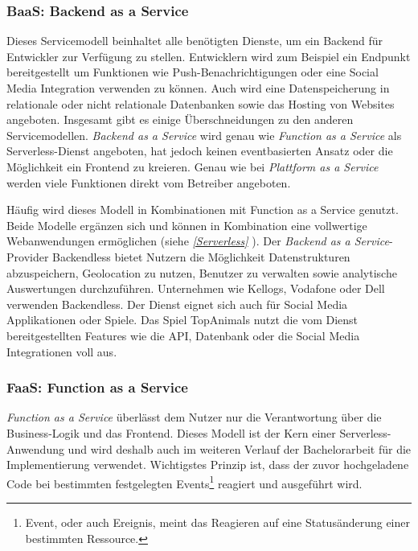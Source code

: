    \subsubsection{BaaS: Backend as a Service}
   Dieses Servicemodell beinhaltet alle benötigten Dienste, um ein Backend für Entwickler zur Verfügung zu stellen.
   Entwicklern wird zum Beispiel ein Endpunkt bereitgestellt um Funktionen wie Push-Benachrichtigungen oder eine Social Media Integration verwenden zu können.
   Auch wird eine Datenspeicherung in relationale oder nicht relationale Datenbanken sowie das Hosting von Websites angeboten. Insgesamt gibt es einige Überschneidungen zu den anderen Servicemodellen.
   \textsl{Backend as a Service} wird genau wie \textsl{Function as a Service} als Serverless-Dienst angeboten, hat jedoch keinen eventbasierten Ansatz oder die Möglichkeit ein Frontend zu kreieren.
   Genau wie bei \textsl{Plattform as a Service} werden viele Funktionen direkt vom Betreiber angeboten.

   Häufig wird dieses Modell in Kombinationen mit Function as a Service genutzt. Beide Modelle ergänzen sich und können in Kombination eine vollwertige
   Webanwendungen ermöglichen (siehe \textit{\ref{Serverless} }).
   Der \textsl{Backend as a Service}-Provider Backendless bietet Nutzern die Möglichkeit Datenstrukturen abzuspeichern, Geolocation zu nutzen,
   Benutzer zu verwalten sowie analytische Auswertungen durchzuführen. Unternehmen wie Kellogs, Vodafone oder Dell verwenden Backendless.
   Der Dienst eignet sich auch für Social Media Applikationen oder Spiele. Das Spiel TopAnimals nutzt die vom Dienst bereitgestellten Features wie
   die API, Datenbank oder die Social Media Integrationen voll aus. \cite{Backendless}

\clearpage
   \subsubsection{FaaS: Function as a Service}
   \label{FaaS}
   \textsl{Function as a Service} überlässt dem Nutzer nur die Verantwortung über die Business-Logik und das Frontend.
   Dieses Modell ist der Kern einer Serverless-Anwendung und wird deshalb auch im weiteren Verlauf der Bachelorarbeit für die Implementierung verwendet.
   Wichtigstes Prinzip ist, dass der zuvor hochgeladene Code bei bestimmten festgelegten Events\footnote{Event, oder auch Ereignis, meint das Reagieren auf eine Statusänderung einer bestimmten Ressource.} reagiert und ausgeführt wird.

